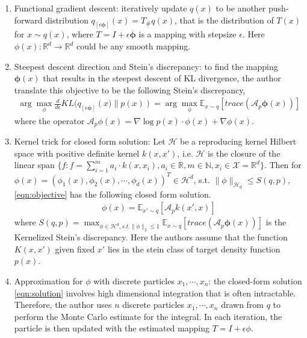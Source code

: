 \begin{enumerate}
    \item Functional gradient descent: iteratively update $q(x)$ to be another push-forward distribution $q_{[\epsilon\mathbf{\phi}]}(x) = T_{\#}q(x)$, that is the distribution of $T(x)$ for $x\sim q(x)$, where $T= I + \epsilon \mathbf{\phi}$ is a mapping with stepsize $\epsilon$. Here $\phi(x): \mathbb{R}^d\rightarrow \mathbb{R}^d$ could be any smooth mapping.
    \item Steepest descent direction and Stein's discrepancy: to find the mapping $\mathbf{\phi}(x)$ that results in the steepest descent of KL divergence, the author translate this objective to be the following Stein's discrepancy,
    \begin{align}
    \label{eqn:objective}
         \arg\max_\phi\frac{d}{d \epsilon}KL(q_{[\epsilon\mathbf{\phi}]}\left(x)\lVert p(x)\right) = \arg\max_\phi \mathbb{E}_{x\sim q}\left[trace\left(\mathcal{A}_p \mathbf{\phi}(x)\right)\right]
    \end{align}
    where the operator $\mathcal{A}_p \phi(x)= \nabla \log p(x) \cdot \phi(x) + \nabla\phi(x)$.
    \item Kernel trick for closed form solution: Let $\mathcal{H}$ be a reproducing kernel Hilbert space with positive definite kernel $k(x,x')$, i.e. $\mathcal{H}$ is the closure of the linear span $\{f: f = \sum_{i=1}^m a_i \cdot k(x, x_i), a_i\in \mathbb{R}, m\in \mathbb{N}, x_i\in \mathcal{X}=\mathbb{R}^d \}$. Then for $\phi(x) = \left(\phi_1(x), \phi_2(x), \cdots, \phi_d(x)\right)^T \in \mathcal{H}^d$, s.t. $\lVert\phi\rVert_{\mathcal{H}_d}\leq S(q, p)$, \eqref{eqn:objective}  has the following closed form solution.
    \begin{align}
    \label{eqn:solution}
        \phi(x) = \mathbb{E}_{x'\sim q}\left[ \mathcal{A}_p k(x', x) \right]
    \end{align}
    where $S(q, p) = \max_{\phi\in \mathcal{H}^d, s.t. \lVert\phi\rVert_2\leq 1} \mathbb{E}_{x\sim q}\left[trace\left(\mathcal{A}_p \mathbf{\phi}(x)\right)\right]$ is the Kernelized Stein's discrepancy. Here the authors assume that the function $K(x, x')$ given fixed $x'$ lies in the stein class of target density function $p(x)$.
    \item Approximation for $\phi$ with discrete particles $x_1, \cdots, x_n$: the closed-form solution \eqref{eqn:solution} involves high dimensional integration that is often intractable. Therefore, the author uses $n$ discrete particles $x_1, \cdots, x_n$ drawn from $q$ to perform the Monte Carlo estimate for the integral. In each iteration, the particle is then updated with the estimated mapping $T = I + \epsilon \phi$.
\end{enumerate}


